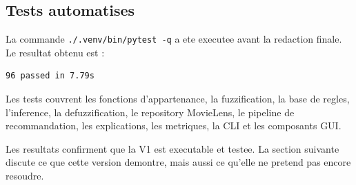\subsection{Tests automatises}

La commande \texttt{./.venv/bin/pytest -q} a ete executee avant la redaction finale. Le resultat obtenu est :
\begin{verbatim}
96 passed in 7.79s
\end{verbatim}
Les tests couvrent les fonctions d'appartenance, la fuzzification, la base de regles, l'inference, la defuzzification, le repository MovieLens, le pipeline de recommandation, les explications, les metriques, la CLI et les composants GUI.

Les resultats confirment que la V1 est executable et testee. La section suivante discute ce que cette version demontre, mais aussi ce qu'elle ne pretend pas encore resoudre.
